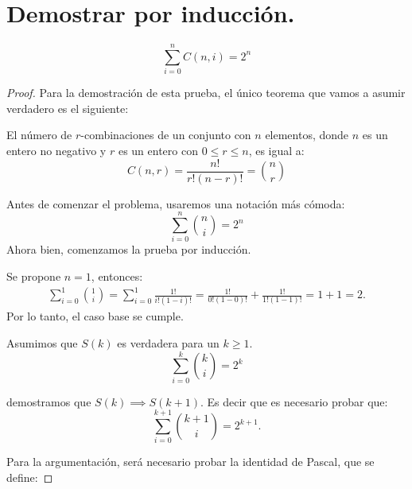 


\section{Demostrar por inducción.}

$$\sum_{i=0}^n C(n,i)=2^n$$

\begin{proof}
Para la demostración de esta prueba, el único teorema que vamos a asumir verdadero es el siguiente: 

\begin{tcolorbox}[colback=gray!15,colframe=gray!1!gray,title=Teorema 2 de la Sección 6.3 de \cite{rosen2012discrete}]
El número de $r$-combinaciones de un conjunto con $n$ elementos, donde $n$ es un entero no negativo y $r$ es un entero con $0\leq r\leq n$, es igual a: 
$$C(n,r)=\frac{n!}{r!(n-r)!} = \binom{n}{r}$$
\end{tcolorbox}

\linita 

Antes de comenzar el problema, usaremos una notación más cómoda: 
$$\sum_{i=0}^n \binom{n}{i}=2^n$$
Ahora bien, comenzamos la prueba por inducción. 

\linita 

\newline 

Se propone $n=1$, entonces: 
\begin{align*}
    \sum_{i=0}^1 \binom{1}{i}= \sum_{i=0}^1 \frac{1!}{i!(1-i)!} = \frac{1!}{0!(1-0)!} +\frac{1!}{1!(1-1)!}=1+1=2.
\end{align*}
Por lo tanto, el caso base se cumple. 

\linita 

\newline 

Asumimos que $S(k)$ es verdadera para un $k\geq 1$.
$$\sum_{i=0}^k \binom{k}{i}=2^k$$

demostramos que $S(k)\implies S(k+1)$. Es decir que es necesario probar que: 
$$\sum_{i=0}^{k+1} \binom{k+1}{i}=2^{k+1}.$$

Para la argumentación, será necesario probar la identidad de Pascal, que se define: 


\end{proof}
